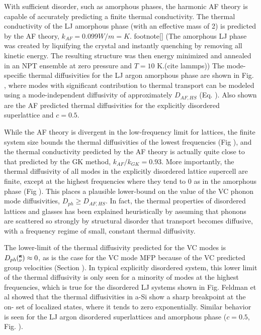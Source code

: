\documentclass[aps,prb,twocolumn,superscriptaddress,amsmath,amssymb,floatfix]{revtex4}
\newcommand{\kv}{\mspace{-4.0mu}\left(\mspace{-8.0mu}
\begin{smallmatrix}&\pmb{\kappa} \\&\nu\end{smallmatrix}
\mspace{-3.0mu}\right)}
\begin{document}
With sufficient disorder, such as amorphous phases, the 
harmonic AF theory is capable of accurately predicting a finite 
thermal conductivity.
\cite{feldman_thermal_1993,shenogin_predicting_2009}  
The thermal conductivity of the LJ amorphous phase (with an effective 
mass of 2) is predicted by the AF theory, $k_{AF} = 0.099 W/m=K$.
footnote[]
(The amorphous LJ phase was created by liquifying the crystal 
and instantly quenching by removing all kinetic energy.  The resulting 
structure was then energy minimized and annealed in an NPT ensemble at 
zero pressure and $T=10$ K.(cite lammps))
The mode-specific thermal diffusivities for the LJ argon amorphous phase 
are shown in Fig. , where modes with significant 
contribution to thermal transport can be modeled using a mode-independent 
diffusivity of approximately $D_{AF,HS}$ (Eq. ). 
Also shown are the AF predicted thermal 
diffusivities for the explicitly disordered superlattice and $c=0.5$. 

While the AF theory is divergent in the low-frequency limit for lattices,  
the finite system size bounds the thermal diffusivities of the lowest 
frequencies (Fig ), and the thermal conductivity predicted by the AF theory 
is actually quite close to that predicted by the GK method, 
$k_{AF}/k_{GK} = 0.93$. More importantly, the thermal diffusivity of all 
modes in the explicitly disordered lattice supercell are finite, except 
at the highest frequencies where they tend to 0 as in the amorphous 
phase (Fig ). 
This places a plausible lower-bound on the value of the VC phonon mode 
diffusivities, $D_{ph} \ge D_{AF,HS}$. In fact,
the thermal properties of disordered lattices and glasses
has been explained heuristically by assuming that phonons
are scattered so strongly by structural disorder that transport 
becomes diffusive, with a frequency regime of small,
constant thermal diffusivity.
\cite{kittel_interpretation_1949,sheng_heat_1991}

The lower-limit of the thermal diffusivity predicted for the VC 
modes is $D_{ph}\kv \approx 0$, as is the case for the VC mode 
MFP because of the VC predicted group velocities (Section ). In typical  
explicitly disordered system, this lower limit of the thermal diffusivity 
is only seen for a minority of modes at the highest frequencies, which 
is true for the disordered LJ systems shown in Fig. 
Feldman et al showed that the thermal 
diffusivities in a-Si show a sharp breakpoint at the on-
set of localized states, where it tends to zero exponentially. 
Similar behavior is seen for the LJ argon disordered superlattices 
and amorphous phase 
($c=0.5$, Fig. ). 
\end{document}
